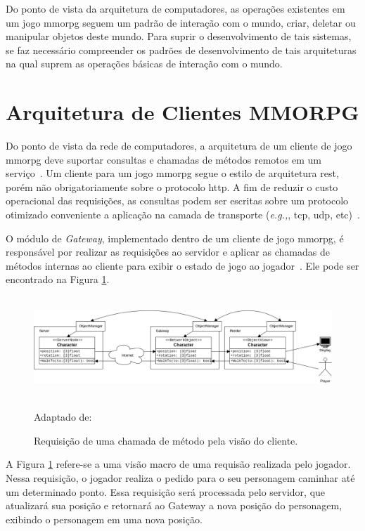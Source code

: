 Do ponto de vista da arquitetura de computadores, as operações existentes em um jogo \ac{mmorpg} seguem um padrão de interação com o mundo, criar, deletar ou manipular objetos deste mundo.
%
Para suprir o desenvolvimento de tais sistemas, se faz necessário compreender os padrões de desenvolvimento de tais arquiteturas na qual suprem as operações básicas de interação com o mundo.


\section{Arquitetura de Clientes MMORPG}
\label{sec:cliente}



Do ponto de vista da rede de computadores, a arquitetura de um cliente de jogo \ac{mmorpg} deve suportar consultas e chamadas de métodos remotos em um serviço~\cite{albion_online_unite}.
%
Um cliente para um jogo \ac{mmorpg} segue o estilo de arquitetura \ac{rest}, porém não obrigatoriamente sobre o protocolo \ac{http}. A fim de reduzir o custo operacional das requisições, as consultas podem ser escritas sobre um protocolo otimizado conveniente a aplicação na camada de transporte (\textit{e.g.,}, \ac{tcp}, \ac{udp}, etc)~\cite{albion_online_unite, stephenclarkewillson2017}.

O módulo de \textit{Gateway}, implementado dentro de um cliente de jogo \ac{mmorpg}, é responsável por realizar as requisições ao servidor e aplicar as chamadas de métodos internas ao cliente para exibir o estado de jogo ao jogador~\cite{albion_online_unite}.
%
Ele pode ser encontrado na Figura \ref{fig:gateway}.


\begin{figure}[htb!]
\caption{Requisição de uma chamada de método pela visão do cliente.}
\label{fig:gateway}
\includegraphics[height=3.8cm]{img/cap2/gateway.png}
\centering

Adaptado de:~\cite{albion_online_unite}
\end{figure}



A Figura \ref{fig:gateway} refere-se a uma visão macro de uma requisão realizada pelo jogador.
%
Nessa requisição, o jogador realiza o pedido para o seu personagem caminhar até um determinado ponto.
%
Essa requisição será processada pelo servidor, que atualizará sua posição e retornará ao Gateway a nova posição do personagem, exibindo o personagem em uma nova posição.



